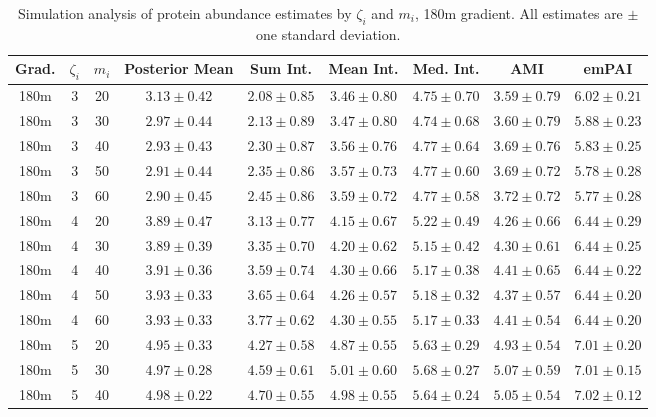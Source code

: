 \begin{table}
\begin{center}
\caption{Simulation analysis of protein abundance estimates by $\zeta_i$ and $m_i$, 180m gradient. All estimates are $\pm$ one standard deviation. \label{supp:proteomics:tab:sim_estimates_180m}}
\begin{tabular}{ccc|c|ccccc}
 Grad. & $\zeta_i$ & $m_i$ & Posterior Mean & Sum Int. & Mean Int. & Med. Int. & AMI & emPAI \\ 
 \hline
180m &   3 &  20 & $3.13 \pm 0.42$ & $2.08 \pm 0.85$ & $3.46 \pm 0.80$ & $4.75 \pm 0.70$ & $3.59 \pm 0.79$ & $6.02 \pm 0.21$ \\ 
  180m &   3 &  30 & $2.97 \pm 0.44$ & $2.13 \pm 0.89$ & $3.47 \pm 0.80$ & $4.74 \pm 0.68$ & $3.60 \pm 0.79$ & $5.88 \pm 0.23$ \\ 
  180m &   3 &  40 & $2.93 \pm 0.43$ & $2.30 \pm 0.87$ & $3.56 \pm 0.76$ & $4.77 \pm 0.64$ & $3.69 \pm 0.76$ & $5.83 \pm 0.25$ \\ 
  180m &   3 &  50 & $2.91 \pm 0.44$ & $2.35 \pm 0.86$ & $3.57 \pm 0.73$ & $4.77 \pm 0.60$ & $3.69 \pm 0.72$ & $5.78 \pm 0.28$ \\ 
  180m &   3 &  60 & $2.90 \pm 0.45$ & $2.45 \pm 0.86$ & $3.59 \pm 0.72$ & $4.77 \pm 0.58$ & $3.72 \pm 0.72$ & $5.77 \pm 0.28$ \\ 
   \hline
180m &   4 &  20 & $3.89 \pm 0.47$ & $3.13 \pm 0.77$ & $4.15 \pm 0.67$ & $5.22 \pm 0.49$ & $4.26 \pm 0.66$ & $6.44 \pm 0.29$ \\ 
  180m &   4 &  30 & $3.89 \pm 0.39$ & $3.35 \pm 0.70$ & $4.20 \pm 0.62$ & $5.15 \pm 0.42$ & $4.30 \pm 0.61$ & $6.44 \pm 0.25$ \\ 
  180m &   4 &  40 & $3.91 \pm 0.36$ & $3.59 \pm 0.74$ & $4.30 \pm 0.66$ & $5.17 \pm 0.38$ & $4.41 \pm 0.65$ & $6.44 \pm 0.22$ \\ 
  180m &   4 &  50 & $3.93 \pm 0.33$ & $3.65 \pm 0.64$ & $4.26 \pm 0.57$ & $5.18 \pm 0.32$ & $4.37 \pm 0.57$ & $6.44 \pm 0.20$ \\ 
  180m &   4 &  60 & $3.93 \pm 0.33$ & $3.77 \pm 0.62$ & $4.30 \pm 0.55$ & $5.17 \pm 0.33$ & $4.41 \pm 0.54$ & $6.44 \pm 0.20$ \\ 
   \hline
180m &   5 &  20 & $4.95 \pm 0.33$ & $4.27 \pm 0.58$ & $4.87 \pm 0.55$ & $5.63 \pm 0.29$ & $4.93 \pm 0.54$ & $7.01 \pm 0.20$ \\ 
  180m &   5 &  30 & $4.97 \pm 0.28$ & $4.59 \pm 0.61$ & $5.01 \pm 0.60$ & $5.68 \pm 0.27$ & $5.07 \pm 0.59$ & $7.01 \pm 0.15$ \\ 
  180m &   5 &  40 & $4.98 \pm 0.22$ & $4.70 \pm 0.55$ & $4.98 \pm 0.55$ & $5.64 \pm 0.24$ & $5.05 \pm 0.54$ & $7.02 \pm 0.12$ \\ 

\end{tabular}
\end{center}
\end{table}
